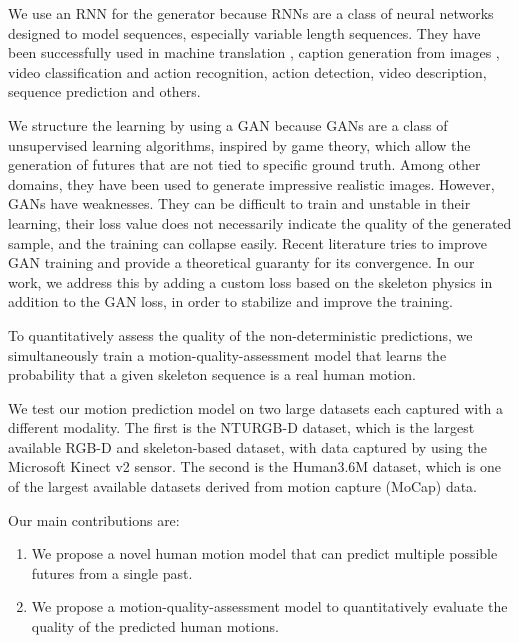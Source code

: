 \documentclass[10pt,twocolumn,letterpaper]{article}
\begin{document}
We use an RNN for the generator because RNNs are a class of neural networks designed to model sequences, especially variable length sequences. They have been successfully used in machine translation \cite{nips2014:Ilya}, caption generation from images \cite{iccv2015:Jia, cvpr2015:Donahue}, video classification and action
recognition\cite{hbu2011:Baccouche, cvpr2015:Yue-Hei, cvpr2015:Donahue}, action detection\cite{cvpr2016:Yeung}, video description\cite{cvpr2016:Pan, corr2014:Kiros, corr2015:Yao, cvpr2015:Donahue}, sequence prediction\cite{corr2013:Graves, icml2015:Srivastava} and others.

We structure the learning by using a GAN because GANs\cite{nips2014:Goodfellow} are a class of unsupervised learning algorithms, inspired by game theory\cite{pjm1958:Sion}, which allow the generation of futures that are not tied to specific ground truth. Among other domains, they have been used to generate impressive realistic images.  
However, GANs have weaknesses. They can be difficult to train and unstable in their learning, their loss value does not necessarily indicate the quality of the generated sample, and the training can collapse easily. Recent literature\cite{corr2017:Arjovsky,corr2017:Ishaan,corr2017:Neyshabur,corr2016:Uehara,corr2017:Qi,corr2016:Mao} tries to improve GAN training and provide a theoretical guaranty for its convergence. In our work, we address this by adding a custom loss based on the skeleton physics in addition to the GAN loss, in order to stabilize and improve the training.

To quantitatively assess the quality of the non-deterministic predictions, we simultaneously train a motion-quality-assessment model that learns the probability that a given skeleton sequence is a real human motion.

We test our motion prediction model on two large datasets each captured with a different modality. The first is the NTURGB-D\cite{cvpr2016:Shahroudy} dataset, which is the largest available RGB-D and skeleton-based dataset, with data captured by using the Microsoft Kinect v2 sensor. The second is the Human3.6M\cite{pami2014:Ionescu,iccv2011:Ionescu} dataset, which is one of the largest available datasets derived from motion capture (MoCap) data.

Our main contributions are:
\begin{enumerate}[noitemsep]
\item We propose a novel human motion model that can predict multiple possible futures from a single past.
\item We propose a motion-quality-assessment model to quantitatively evaluate the quality of the predicted human motions.
\end{enumerate}
\end{document}
